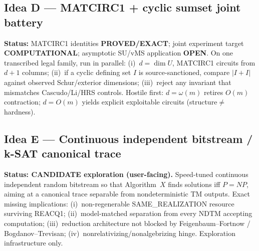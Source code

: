 \documentclass[11pt]{article}
\begin{document}
\subsection*{Idea D --- MATCIRC1 + cyclic sumset joint battery}
\textbf{Status:} MATCIRC1 identities \textbf{PROVED/EXACT}; joint experiment target
\textbf{COMPUTATIONAL}; asymptotic SU/vMS application \textbf{OPEN}.
On one transcribed legal family, run in parallel: (i)~$d=\dim U$, MATCIRC1 circuits from
$d+1$ columns; (ii)~if a cyclic defining set $I$ is source-sanctioned, compare $|I+I|$ against
observed Schur/exterior dimensions; (iii)~reject any invariant that mismatches Cascudo/Li/HRS
controls. Hostile first: $d=\omega(m)$ retires $O(m)$ contraction; $d=O(m)$ yields explicit
exploitable circuits (structure$\neq$hardness).

\subsection*{Idea E --- Continuous independent bitstream / k-SAT canonical trace}
\textbf{Status: CANDIDATE exploration (user-facing).}
Speed-tuned continuous independent random bitstream so that Algorithm~$X$ finds solutions iff
$P=NP$, aiming at a canonical trace separable from nondeterministic TM outputs.
Exact missing implications: (i)~non-regenerable SAME\_REALIZATION resource surviving REACQ1;
(ii)~model-matched separation from every NDTM accepting computation;
(iii)~reduction architecture not blocked by Feigenbaum--Fortnow / Bogdanov--Trevisan;
(iv)~nonrelativizing/nonalgebrizing hinge. Exploration infrastructure only.
\end{document}
